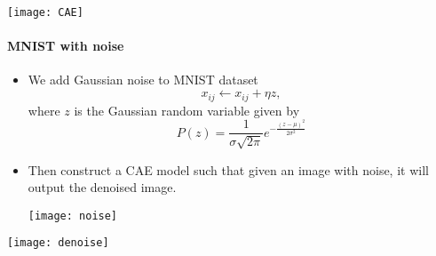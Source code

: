     \begin{center}
        \texttt{[image: CAE]}
    \end{center}

\paragraph{MNIST with noise}
    \begin{itemize}
        \item We add Gaussian noise to MNIST dataset
            \begin{equation*}
                x_{ij} \leftarrow x_{ij}+\eta z,
            \end{equation*}
            where $z$ is the Gaussian random variable given by 
            \begin{equation*}
                P(z)= \frac{1}{\sigma\sqrt{2\pi}}e^{-\frac{(z-\mu)^2}{2\sigma^2}}
            \end{equation*}
         \item Then construct a CAE model such that given an image with noise, it will output the denoised image.

             \begin{center}
                 \texttt{[image: noise]}
             \end{center}
    \end{itemize}
    \begin{center}
        \texttt{[image: denoise]}
    \end{center}


